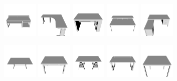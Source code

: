 \begin{figure}[!hbt]
	\centering
	\includegraphics[width=0.15\textwidth]{Figures/ObjRecog/desk_0}\hfill
	\includegraphics[width=0.15\textwidth]{Figures/ObjRecog/desk_1}\hfill
	\includegraphics[width=0.15\textwidth]{Figures/ObjRecog/desk_2}\hfill
	\includegraphics[width=0.15\textwidth]{Figures/ObjRecog/desk_3}\hfill
	\includegraphics[width=0.15\textwidth]{Figures/ObjRecog/desk_4}\hfill

	\includegraphics[width=0.15\textwidth]{Figures/ObjRecog/table_0}\hfill
	\includegraphics[width=0.15\textwidth]{Figures/ObjRecog/table_1}\hfill
	\includegraphics[width=0.15\textwidth]{Figures/ObjRecog/table_2}\hfill
	\includegraphics[width=0.15\textwidth]{Figures/ObjRecog/table_3}\hfill
	\includegraphics[width=0.15\textwidth]{Figures/ObjRecog/table_4}\hfill


\end{figure}
